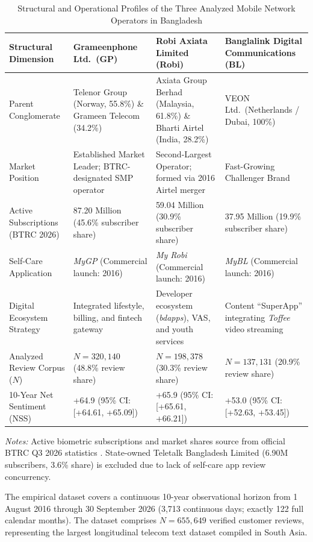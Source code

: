 \documentclass[5p,twocolumn,authoryear]{elsarticle}
\begin{document}
\begin{table}[t]
\centering
\caption{Structural and Operational Profiles of the Three Analyzed Mobile Network Operators in Bangladesh}
\label{tab:operator_profile}
\footnotesize
\setlength{\tabcolsep}{5pt}
\begin{tabularx}{\textwidth}{@{}lXXX@{}}
\toprule
Structural Dimension & Grameenphone Ltd.\ (GP) & Robi Axiata Limited (Robi) & Banglalink Digital Communications (BL) \\
\midrule
Parent Conglomerate & Telenor Group (Norway, 55.8\%) \& Grameen Telecom (34.2\%) & Axiata Group Berhad (Malaysia, 61.8\%) \& Bharti Airtel (India, 28.2\%) & VEON Ltd.\ (Netherlands / Dubai, 100\%) \\
Market Position & Established Market Leader; BTRC-designated SMP operator & Second-Largest Operator; formed via 2016 Airtel merger & Fast-Growing Challenger Brand \\
Active Subscriptions (BTRC 2026) & 87.20 Million (45.6\% subscriber share) & 59.04 Million (30.9\% subscriber share) & 37.95 Million (19.9\% subscriber share) \\
Self-Care Application & \textit{MyGP} (Commercial launch: 2016) & \textit{My Robi} (Commercial launch: 2016) & \textit{MyBL} (Commercial launch: 2016) \\
Digital Ecosystem Strategy & Integrated lifestyle, billing, and fintech gateway & Developer ecosystem (\textit{bdapps}), VAS, and youth services & Content ``SuperApp'' integrating \textit{Toffee} video streaming \\
Analyzed Review Corpus ($N$) & $N = 320{,}140$ (48.8\% review share) & $N = 198{,}378$ (30.3\% review share) & $N = 137{,}131$ (20.9\% review share) \\
10-Year Net Sentiment (NSS) & +64.9 (95\% CI: [+64.61, +65.09]) & +65.9 (95\% CI: [+65.61, +66.21]) & +53.0 (95\% CI: [+52.63, +53.45]) \\
\bottomrule
\end{tabularx}
\vspace{0.4em}
\parbox{\textwidth}{\footnotesize \textit{Notes:} Active biometric subscriptions and market shares source from official BTRC Q3 2026 statistics \citep{btrc2026quarterly}. State-owned Teletalk Bangladesh Limited (6.90M subscribers, 3.6\% share) is excluded due to lack of self-care app review concurrency.}
\end{table}

The empirical dataset covers a continuous 10-year observational horizon from 1 August 2016 through 30 September 2026 (3,713 continuous days; exactly 122 full calendar months). The dataset comprises $N = 655{,}649$ verified customer reviews, representing the largest longitudinal telecom text dataset compiled in South Asia.
\end{document}
